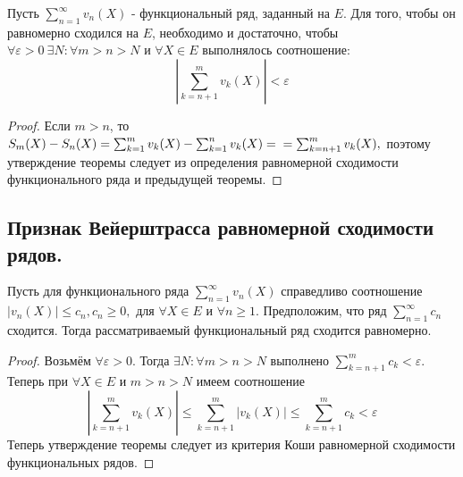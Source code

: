 \documentclass[main]{subfiles}
\begin{document}
\begin{theorem} 
    Пусть $\sum^{\infty}_{n=1} v_n(X)$ - функциональный ряд, заданный на $E$. Для того, чтобы он равномерно сходился на $E$,
     необходимо и достаточно, чтобы $\forall \varepsilon>0\ \exists N: \forall m>n>N$ 
     и $\forall X\in E$ выполнялось соотношение: \[ \left|\sum_{k=n+1}^m v_k(X)\right|<\varepsilon\tag{5} \]
\end{theorem}
\begin{proof}
     Если $m>n$, то $S_m(X)-S_n(X)=\sum_{k=1}^m v_k(X)-\sum_{k=1}^n
 v_k(X)=\\=\sum_{k=n+1}^m v_k(X),$ поэтому утверждение теоремы следует из 
 определения равномерной сходимости функционального ряда и предыдущей теоремы.
\end{proof}
\subsection{Признак Вейерштрасса равномерной сходимости рядов.}
\begin{theorem}
     Пусть для функционального ряда $\sum^{\infty}_{n=1} v_n(X) $ справедливо соотношение
      $|v_n(X)|\leq c_n, c_n\geq 0,$ для $\forall X\in E$ и $\forall n\geq 1.$ 
      Предположим, что ряд $\sum^{\infty}_{n=1} c_n$ сходится. Тогда рассматриваемый функциональный ряд сходится равномерно.\end{theorem}
\begin{proof} 
    Возьмём $\forall \varepsilon >0.$ Тогда $\exists N: \forall m>n>N$ выполнено $\sum_{k=n+1}^m c_k<\varepsilon$. 
    Теперь при $\forall X\in E$ и $m>n>N$ имеем соотношение 
    \[ |\sum_{k=n+1}^m v_k(X)|\leq \sum_{k=n+1}^m |v_k(X)|\leq \sum_{k=n+1}^m c_k<\varepsilon \]
Теперь утверждение теоремы следует из критерия Коши равномерной сходимости функциональных рядов. \end{proof}
\end{document}
